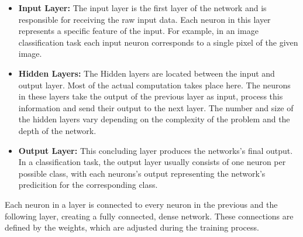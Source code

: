 \documentclass[12pt,fleqn,a4paper]{article}
\begin{document}
\begin{itemize}
     \item \textbf{Input Layer:} The input layer is the first layer of the network and is responsible for receiving the raw input data. Each neuron in this layer represents a specific feature of the input. For example, in an image classification task each input neuron corresponds to a single pixel of the given image.
     \item \textbf{Hidden Layers:} The Hidden layers are located between the input and output layer. Most of the actual computation takes place here. The neurons in these layers take the output of the previous layer as input, process this information and send their output to the next layer. The number and size of the hidden layers vary depending on the complexity of the problem and the depth of the network.
     \item \textbf{Output Layer:} This concluding layer produces the networks's final output. In a classification task, the output layer usually consists of one neuron per possible class, with each neurons's output representing the network's predicition for the corresponding class.
\end{itemize}

Each neuron in a layer is connected to every neuron in the previous and the following layer, creating a fully connected, dense network. These connections are defined by the weights, which are adjusted during the training process.
\end{document}
